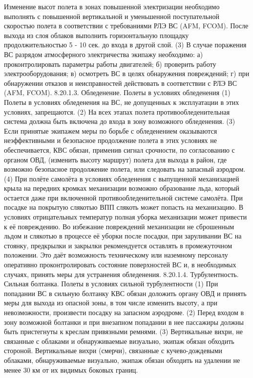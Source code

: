 Изменение высот полета в зонах повышенной электризации необходимо выполнять с повышенной вертикальной и уменьшенной поступательной скоростью полета в соответствии с требованиями РЛЭ ВС (AFM, FCOM).
После выхода из слоя облаков выполнить горизонтальную площадку продолжительностью 5 - 10 сек. до входа в другой слой.
(3) В случае поражения ВС разрядом атмосферного электричества экипажу необходимо:
а)	проконтролировать параметры работы двигателей;
б)	проверить работу электрооборудования;
в)	осмотреть ВС в целях обнаружения повреждений;
г)	при обнаружении отказов и неисправностей действовать в соответствии с РЛЭ ВС (AFM, FCOM).
8.20.1.3.	Обледенение. Полеты в условиях обледенения
(1) Полеты в условиях обледенения на ВС, не допущенных к эксплуатации в этих условиях, запрещаются.
(2) На всех этапах полета противообледенительная система должна быть включена до входа в зону возможного обледенения.
(3) Если принятые экипажем меры по борьбе с обледенением оказываются неэффективными и безопасное продолжение полета в этих условиях не обеспечивается, КВС обязан, применив сигнал срочности, по согласованию с органом ОВД, (изменить высоту маршрут) полета для выхода в район, где возможно безопасное продолжение полета, или следовать на запасный аэродром.
(4) При полёте самолёта в условиях обледенения с выпущенной механизацией крыла на передних кромках механизации возможно образование льда, который остается даже при включенной противообледенительной системе самолёта.
При посадке на покрытую слякотью ВПП слякоть может попасть на механизацию. В условиях отрицательных температур полная уборка механизации может привести к её повреждению.
Во избежание повреждений механизации не сброшенным льдом и слякотью в процессе её уборки после посадки, при заруливании ВС на стоянку, предкрылки и закрылки рекомендуется оставлять в промежуточном положении. Это даёт возможность техническому или наземному персоналу оперативно проконтролировать состояние поверхностей ВС и, в необходимых случаях, принять меры для устранения обледенения.
8.20.1.4.	Турбулентность. Сильная болтанка. Полеты в условиях сильной турбулентности
(1) При попадании ВС в сильную болтанку КВС обязан доложить органу ОВД и принять меры для выхода из опасной зоны, в том числе изменить высоту, а при невозможности, произвести посадку на запасном аэродроме.
(2) Перед входом в зону возможной болтанки и при внезапном попадании в нее пассажиры должны быть пристегнуты к креслам привязными ремнями.
(3) Вертикальные вихри, не связанные с облаками и обнаруживаемые визуально, экипаж обязан обходить стороной. Вертикальные вихри (смерчи), связанные с кучево-дождевыми облаками, обнаруживаемые визуально, экипаж обязан обходить на удалении не менее 30 км от их видимых боковых границ. 
